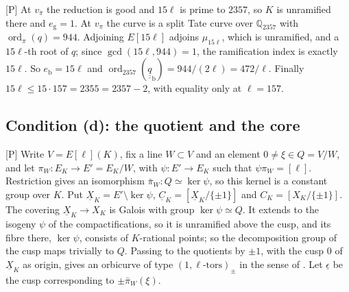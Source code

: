 \documentclass[11pt,a4paper]{article}
\newcommand{\Q}{\mathbb{Q}}
\newcommand{\ord}{\operatorname{ord}}
\newcommand{\qq}{\underline{\underline{q}}}
\newcommand{\tP}{\textup{[P]}}
\theoremstyle{plain}
\theoremstyle{definition}
\begin{document}
\tP{} At $v_{\bar\pi}$ the reduction is good and $15\ell$ is prime to $2357$, so $K$ is unramified there and
$e_{\mathrm g}=1$. At $v_\pi$ the curve is a split Tate curve over $\Q_{2357}$ with $\ord_\pi(q)=944$. Adjoining
$E[15\ell]$ adjoins $\mu_{15\ell}$, which is unramified, and a $15\ell$-th root of $q$; since $\gcd(15\ell,944)=1$, the
ramification index is exactly $15\ell$. So $e_{\mathrm b}=15\ell$ and $\ord_{2357}(\qq_{\mathrm b})=944/(2\ell)=472/\ell$.
Finally $15\ell\le15\cdot157=2355=2357-2$, with equality only at $\ell=157$.

\subsection{Condition (d): the quotient and the core}\label{ss:core}

\tP{} Write $V=E[\ell](K)$, fix a line $W\subset V$ and an element $0\ne\xi\in Q=V/W$, and let
$\pi_W\colon E_K\to E'=E_K/W$, with $\psi\colon E'\to E_K$ such that $\psi\pi_W=[\ell]$. Restriction gives an
isomorphism $\bar\pi_W\colon Q\simeq\ker\psi$, so this kernel is a constant group over $K$. Put $\underline
X_K=E'\setminus\ker\psi$, $\underline C_K=[\underline X_K/\{\pm1\}]$ and $C_K=[X_K/\{\pm1\}]$. The covering $\underline
X_K\to X_K$ is Galois with group $\ker\psi\simeq Q$. It extends to the isogeny $\psi$ of the compactifications, so it is
unramified above the cusp, and its fibre there, $\ker\psi$, consists of $K$-rational points; so the decomposition group
of the cusp maps trivially to $Q$. Passing to the quotients by $\pm1$, with the cusp $0$ of $\underline X_K$ as origin, gives an orbicurve of type
$(1,\ell\text{-tors})_\pm$ in the sense of \cite[Def.~2.1]{EtTh}. Let $\underline\epsilon$ be the cusp corresponding to
$\pm\bar\pi_W(\xi)$.
\end{document}

